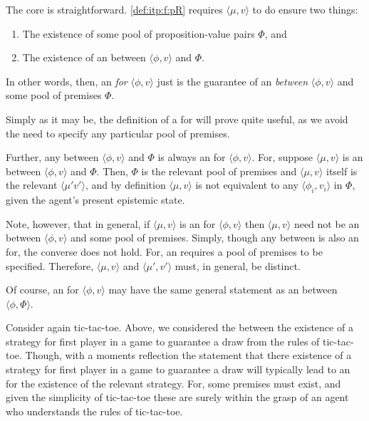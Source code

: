 \begin{note}
  The core is straightforward.
  \ref{def:itp:f:pR} requires \(\langle \mu,v \rangle\) to do ensure two things:
  \begin{enumerate}
  \item The existence of some pool of proposition-value pairs \(\Phi\), and
  \item The existence of an  between \(\langle \phi,v \rangle\) and \(\Phi\).
  \end{enumerate}
  In other words, then, an  \emph{for} \(\langle \phi,v \rangle\) just is the guarantee of an  \emph{between} \(\langle \phi,v \rangle\) and some pool of premises \(\Phi\).

  Simply as it may be, the definition of a  for will prove quite useful, as we avoid the need to specify any particular pool of premises.

  Further, any  between \(\langle \phi,v \rangle\) and \(\Phi\) is always an  for \(\langle \phi,v \rangle\).
  For, suppose \(\langle \mu,v \rangle\) is an  between \(\langle \phi,v \rangle\) and \(\Phi\).
  Then, \(\Phi\) is the relevant pool of premises and \(\langle \mu,v \rangle\) itself is the relevant \(\langle \mu'v' \rangle\), and by definition \(\langle \mu,v \rangle\) is not equivalent to any \(\langle \phi_{i},v_{i} \rangle\) in \(\Phi\), given the agent's present epistemic state.

  Note, however, that in general, if \(\langle \mu,v \rangle\) is an  for \(\langle \phi,v \rangle\) then \(\langle \mu,v \rangle\) need not be an  between \(\langle \phi,v \rangle\) and some pool of premises.
  Simply, though any  between is also an  for, the converse does not hold.
  For, an  requires a pool of premises to be specified.
  Therefore, \(\langle \mu,v \rangle\) and \(\langle \mu',v' \rangle\) must, in general, be distinct.

  Of course, an  for \(\langle \phi,v \rangle\) may have the same general statement as an  between \(\langle \phi,\Phi \rangle\).

  Consider again tic-tac-toe.
  Above, we considered the  between the existence of a strategy for first player in a game to guarantee a draw from the rules of tic-tac-toe.
  Though, with a moments reflection the statement that there existence of a strategy for first player in a game to guarantee a draw will typically lead to an  for the existence of the relevant strategy.
  For, some premises must exist, and given the simplicity of tic-tac-toe these are surely within the grasp of an agent who understands the rules of tic-tac-toe.
\end{note}

